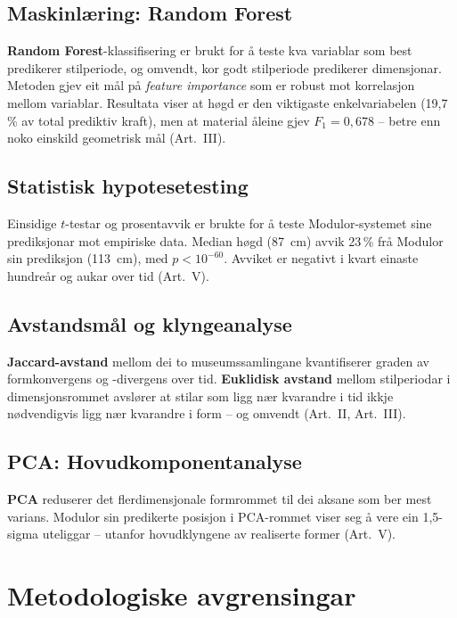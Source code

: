 \documentclass[12pt,a4paper,oneside]{report}
\begin{document}
\subsection{Maskinlæring: Random Forest}

\textbf{Random Forest}-klassifisering er brukt for å teste kva variablar som best predikerer stilperiode, og omvendt, kor godt stilperiode predikerer dimensjonar. Metoden gjev eit mål på \emph{feature importance} som er robust mot korrelasjon mellom variablar. Resultata viser at høgd er den viktigaste enkelvariabelen (19,7\,\% av total prediktiv kraft), men at material åleine gjev $F_1 = 0{,}678$ -- betre enn noko einskild geometrisk mål (Art.~III).

\subsection{Statistisk hypotesetesting}

Einsidige $t$-testar og prosentavvik er brukte for å teste Modulor-systemet sine prediksjonar mot empiriske data. Median høgd (87~cm) avvik 23\,\% frå Modulor sin prediksjon (113~cm), med $p < 10^{-60}$. Avviket er negativt i kvart einaste hundreår og aukar over tid (Art.~V).

\subsection{Avstandsmål og klyngeanalyse}

\textbf{Jaccard-avstand} mellom dei to museumssamlingane kvantifiserer graden av formkonvergens og -divergens over tid. \textbf{Euklidisk avstand} mellom stilperiodar i dimensjonsrommet avslører at stilar som ligg nær kvarandre i tid ikkje nødvendigvis ligg nær kvarandre i form -- og omvendt (Art.~II, Art.~III).

\subsection{PCA: Hovudkomponentanalyse}

\textbf{PCA} reduserer det flerdimensjonale formrommet til dei aksane som ber mest varians. Modulor sin predikerte posisjon i PCA-rommet viser seg å vere ein 1,5-sigma uteliggar -- utanfor hovudklyngene av realiserte former (Art.~V).

\section{Metodologiske avgrensingar}
\end{document}
